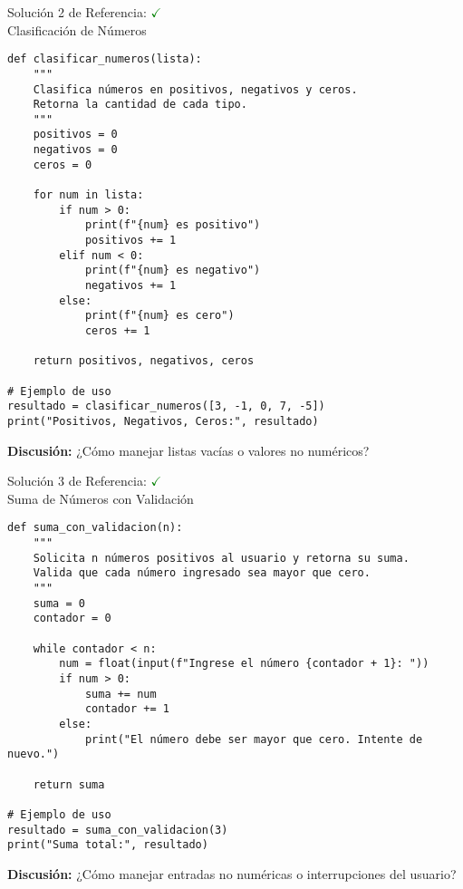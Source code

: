 \documentclass[10pt]{beamer}
\begin{document}
\begin{frame}[fragile]{Solución 2 de Referencia: \hfill \textcolor{green}{$\checkmark$} \\ 
Clasificación de Números}
\begin{verbatim}
def clasificar_numeros(lista):
    """
    Clasifica números en positivos, negativos y ceros.
    Retorna la cantidad de cada tipo.
    """
    positivos = 0
    negativos = 0
    ceros = 0

    for num in lista:
        if num > 0:
            print(f"{num} es positivo")
            positivos += 1
        elif num < 0:
            print(f"{num} es negativo")
            negativos += 1
        else:
            print(f"{num} es cero")
            ceros += 1

    return positivos, negativos, ceros

# Ejemplo de uso
resultado = clasificar_numeros([3, -1, 0, 7, -5])
print("Positivos, Negativos, Ceros:", resultado)
\end{verbatim}
\textbf{Discusión:} ¿Cómo manejar listas vacías o valores no numéricos?
\end{frame}

\begin{frame}[fragile]{Solución 3 de Referencia: \hfill \textcolor{green}{$\checkmark$} \\ 
Suma de Números con Validación}
\begin{verbatim}
def suma_con_validacion(n):
    """
    Solicita n números positivos al usuario y retorna su suma.
    Valida que cada número ingresado sea mayor que cero.
    """
    suma = 0
    contador = 0

    while contador < n:
        num = float(input(f"Ingrese el número {contador + 1}: "))
        if num > 0:
            suma += num
            contador += 1
        else:
            print("El número debe ser mayor que cero. Intente de nuevo.")

    return suma

# Ejemplo de uso
resultado = suma_con_validacion(3)
print("Suma total:", resultado)
\end{verbatim}
\textbf{Discusión:} ¿Cómo manejar entradas no numéricas o interrupciones del usuario?
\end{frame}
\end{document}
